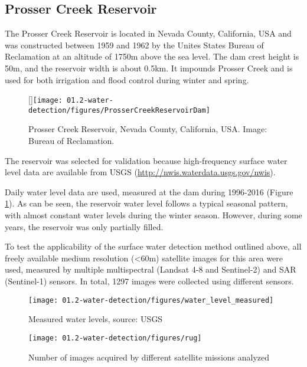 \subsection{Prosser Creek Reservoir}

The Prosser Creek Reservoir is located in Nevada County, California, USA and was constructed between 1959 and 1962 by the Unites States Bureau of Reclamation at an altitude of 1750m above the sea level. The dam crest height is 50m, and the reservoir width is about 0.5km. It impounds Prosser Creek and is used for both irrigation and flood control during winter and spring. 

\begin{wrapfigure}{r}{0pt}
	\raisebox{0pt}[\dimexpr{}\baselineskip\relax]{\texttt{[image: 01.2-water-detection/figures/ProsserCreekReservoirDam]}}
	\caption{Prosser Creek Reservoir, Nevada County, California, USA. Image: Bureau of Reclamation.}
\end{wrapfigure}

The reservoir was selected for validation because high-frequency surface water level data are available from USGS (\url{http://nwis.waterdata.usgs.gov/nwis}). 

Daily water level data are used, measured at the dam during 1996-2016 (Figure \ref{fig:pc-water-levels}). As can be seen, the reservoir water level follows a typical seasonal pattern, with almost constant water levels during the winter season. However, during some years, the reservoir was only partially filled.

To test the applicability of the surface water detection method outlined above, all freely available medium resolution (<60m) satellite images for this area were used, measured by multiple multispectral (Landsat 4-8 and Sentinel-2) and \gls{SAR} (Sentinel-1) sensors. In total, 1297 images were collected using different sensors.

\begin{figure}[H]
	\centering
	\texttt{[image: 01.2-water-detection/figures/water\_level\_measured]}
	\caption{Measured water levels, source: USGS}
	\label{fig:pc-water-levels}
\end{figure}

\begin{figure}[H]
	\centering
	\texttt{[image: 01.2-water-detection/figures/rug]}
	\caption{Number of images acquired by different satellite missions analyzed}
	\label{fig:pc-n-images}
\end{figure}

